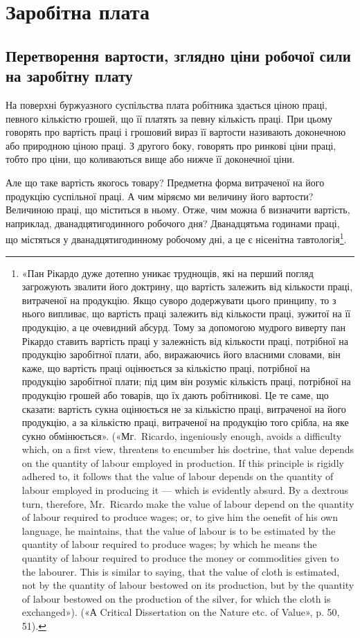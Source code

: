 
\chapter{Заробітна плата}

\section{Перетворення вартости, зглядно ціни робочої
сили на заробітну плату}

На поверхні буржуазного суспільства плата робітника здається
ціною праці, певного кількістю грошей, що її платять за
певну кількість праці. При цьому говорять про вартість праці
і грошовий вираз її вартости називають доконечною або природною
ціною праці. З другого боку, говорять про ринкові ціни
праці, тобто про ціни, що коливаються вище або нижче її доконечної
ціни.

Але що таке вартість якогось товару? Предметна форма витраченої
на його продукцію суспільної праці. А чим міряємо
ми величину його вартости? Величиною праці, що міститься
в ньому. Отже, чим можна б визначити вартість, наприклад,
дванадцятигодинного робочого дня? Дванадцятьма годинами
праці, що містяться у дванадцятигодинному робочому дні, а це
є нісенітна тавтологія\footnote{
«Пан Рікардо дуже дотепно уникає труднощів, які на перший
погляд загрожують звалити його доктрину, що вартість залежить від
кількости праці, витраченої на продукцію. Якщо суворо додержувати
цього принципу, то з нього випливає, що вартість праці залежить від
кількости праці, зужитої на її продукцію, а це очевидний абсурд. Тому
за допомогою мудрого виверту пан Рікардо ставить вартість праці у
залежність від кількости праці, потрібної на продукцію заробітної плати,
або, виражаючись його власними словами, він каже, що вартість праці
оцінюється за кількістю праці, потрібної на продукцію заробітної плати;
під цим він розуміє кількість праці, потрібної на продукцію грошей або
товарів, що їх дають робітникові. Це те саме, що сказати: вартість сукна
оцінюється не за кількістю праці, витраченої на його продукцію, а за
кількістю праці, витраченої на продукцію того срібла, на яке сукно
обмінюється». («Мг.~Ricardo, ingeniously enough, avoids a difficulty
which, on a first view, threatens to encumber his doctrine, that value depends
on the quantity of labour employed in production. If this principle
is rigidly adhered to, it follows that the value of labour depends on the
quantity of labour employed in producing it — which is evidently absurd.
By a dextrous turn, therefore, Mr.~Ricardo make the value of labour depend
on the quantity of labour required to produce wages; or, to give him the
oenefit of his own language, he maintains, that the value of labour is to
be estimated by the quantity of labour required to produce wages; by which
he means the quantity of labour required to produce the money or commodities
given to the labourer. This is similar to saying, that the value of cloth
is estimated, not by the quantity of labour bestowed on its production,
but by the quantity of labour bestowed on the production of the silver,
for which the cloth is exchanged»). («А Critical Dissertation on the Nature
etc. of Value», p. 50, 51).
}.

